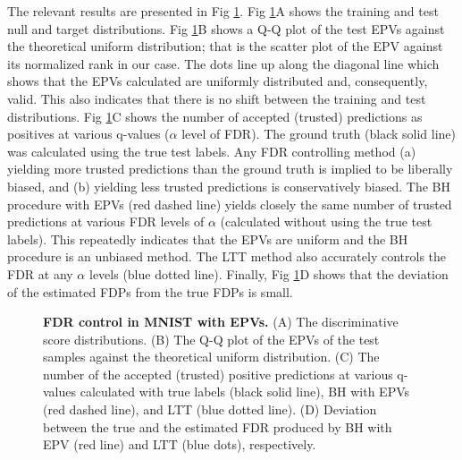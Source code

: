 \documentclass[10pt,letterpaper]{article}
\begin{document}
The relevant results are presented in Fig \ref{fig:binary}.
Fig \ref{fig:binary}A shows the training and test null and target distributions. %
Fig \ref{fig:binary}B shows a Q-Q plot of the test EPVs against the theoretical uniform distribution; that is the scatter plot of the EPV against its normalized rank in our case.
The dots line up along the diagonal line which shows that the EPVs calculated are uniformly distributed and, consequently, valid.
This also indicates that there is no shift between the training and test distributions. %
Fig \ref{fig:binary}C shows the number of accepted (trusted) predictions as positives at various q-values ($\alpha$ level of FDR).
The ground truth (black solid line) was calculated using the true test labels.
Any FDR controlling method (a) yielding more trusted predictions than the ground truth is implied to be liberally biased, and (b) yielding less trusted predictions is conservatively biased.
The BH procedure with EPVs (red dashed line) yields closely the same number of trusted predictions at various FDR levels of $\alpha$ (calculated without using the true test labels).
This repeatedly indicates that the EPVs are uniform and the  BH procedure is an unbiased method.
The LTT method also accurately controls the FDR at any $\alpha$ levels (blue dotted line).
Finally, Fig \ref{fig:binary}D shows that the deviation of the estimated FDPs from the true FDPs is small.

\begin{figure}
	\centering
	\caption{{\bf FDR control in MNIST with EPVs. } (A) The discriminative score distributions.
	(B) The Q-Q plot of the EPVs of the test samples against the theoretical uniform distribution.
	(C) The number of the accepted (trusted) positive predictions at various q-values calculated with true labels (black solid line), BH with EPVs (red dashed line), and LTT (blue dotted line).
	(D) Deviation between the true and the estimated FDR produced by BH with EPV (red line) and LTT (blue dots), respectively.}
	\label{fig:binary}
\end{figure}
 
\end{document}
